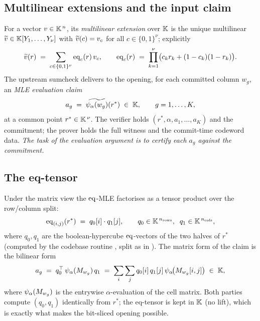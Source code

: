 \subsection{Multilinear extensions and the input claim}

For a vector $v \in \mathbb{K}^{\,n}$, its \emph{multilinear extension} over
$\mathbb{K}$ is the unique multilinear $\widetilde{v} \in \mathbb{K}[Y_1,\dots,Y_\nu]$ with
$\widetilde{v}(c) = v_c$ for all $c \in \{0,1\}^{\nu}$; explicitly
\[
  \widetilde{v}(r) \;=\; \sum_{c \in \{0,1\}^{\nu}} \operatorname{eq}_c(r)\,v_c,
  \qquad
  \operatorname{eq}_c(r) \;=\; \prod_{k=1}^{\nu}\bigl(c_k r_k + (1-c_k)(1-r_k)\bigr).
\]
The upstream sumcheck delivers to the opening, for each committed column
$w_g$, an \emph{MLE evaluation claim}
\[
  a_g \;=\; \widetilde{\psi_{\alpha}(w_g)}(r^*) \;\in\; \mathbb{K},
  \qquad g = 1, \dots, K,
\]
at a common point $r^* \in \mathbb{K}^{\,\nu}$. The verifier holds
$(r^*, \alpha, a_1, \dots, a_K)$ and the commitment; the prover holds the
full witness and the commit-time codeword data. \emph{The task of the
evaluation argument is to certify each $a_g$ against the commitment.}

\subsection{The eq-tensor}
\label{sec:eqtensor}

Under the matrix view the $\operatorname{eq}$-MLE factorises as a tensor product over
the row/column split:
\[
  \operatorname{eq}_{(i,j)}(r^*) \;=\; q_0[i]\cdot q_1[j],
  \qquad
  q_0 \in \mathbb{K}^{\,n_{\mathrm{rows}}},\;\; q_1 \in \mathbb{K}^{\,n_{\mathrm{cols}}},
\]
where $q_0, q_1$ are the boolean-hypercube $\operatorname{eq}$-vectors of the two
halves of $r^*$ (computed by the codebase routine
, split as in ).
The matrix form of the claim is the bilinear form
\begin{equation}
  \label{eq:claim-bilinear}
  a_g \;=\; q_0^{\top}\,\psi_{\alpha}(M_{w_g})\,q_1
  \;=\; \sum_{i}\sum_{j} q_0[i]\,q_1[j]\,\psi_{\alpha}\!\bigl(M_{w_g}[i,j]\bigr)
  \;\in\;\mathbb{K},
\end{equation}
where $\psi_{\alpha}(M_{w_g})$ is the entrywise $\alpha$-evaluation of the cell
matrix. Both parties compute $(q_0, q_1)$ identically from $r^*$; the
eq-tensor is kept in $\mathbb{K}$ (no lift), which is exactly what makes the
bit-sliced opening possible.
